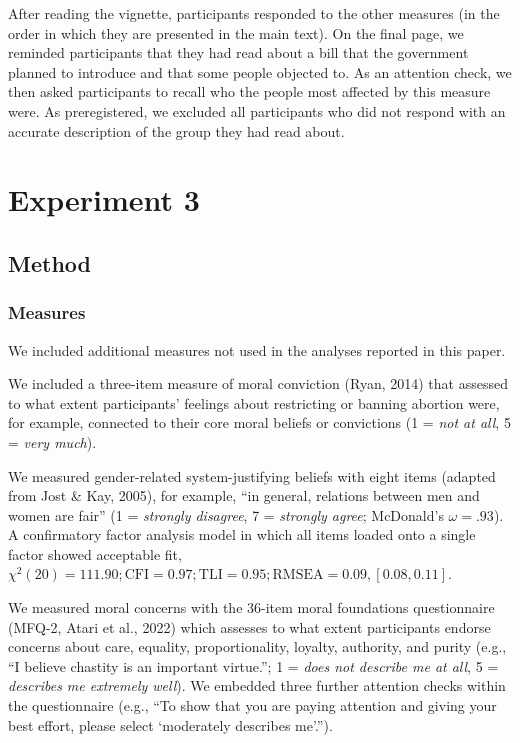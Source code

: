 \documentclass[12pt, letterpaper]{article}
\begin{document}
After reading the vignette, participants responded to the other measures
(in the order in which they are presented in the main text). On the
final page, we reminded participants that they had read about a bill
that the government planned to introduce and that some people objected
to. As an attention check, we then asked participants to recall who the
people most affected by this measure were. As preregistered, we excluded
all participants who did not respond with an accurate description of the
group they had read about.

\hypertarget{experiment-3}{%
\section{Experiment 3}\label{experiment-3}}

\hypertarget{method-1}{%
\subsection{Method}\label{method-1}}

\hypertarget{measures}{%
\subsubsection{Measures}\label{measures}}

We included additional measures not used in the analyses reported in
this paper.

We included a three-item measure of moral conviction (Ryan, 2014) that
assessed to what extent participants' feelings about restricting or
banning abortion were, for example, connected to their core moral
beliefs or convictions (1 = \emph{not at all}, 5 = \emph{very much}).

We measured gender-related system-justifying beliefs with eight items
(adapted from Jost \& Kay, 2005), for example, ``in general, relations
between men and women are fair'' (1 = \emph{strongly disagree}, 7 =
\emph{strongly agree}; McDonald's \(\omega = .93\)). A confirmatory
factor analysis model in which all items loaded onto a single factor
showed acceptable fit,
\(\chi^2 (20) = 111.90; \text{CFI} = 0.97; \text{TLI} = 0.95; \text{RMSEA} = 0.09, [0.08, 0.11]\).

We measured moral concerns with the 36-item moral foundations
questionnaire (MFQ-2, Atari et al., 2022) which assesses to what extent
participants endorse concerns about care, equality, proportionality,
loyalty, authority, and purity (e.g., ``I believe chastity is an
important virtue.''; 1 = \emph{does not describe me at all}, 5 =
\emph{describes me extremely well}). We embedded three further attention
checks within the questionnaire (e.g., ``To show that you are paying
attention and giving your best effort, please select `moderately
describes me'.'').
\end{document}
